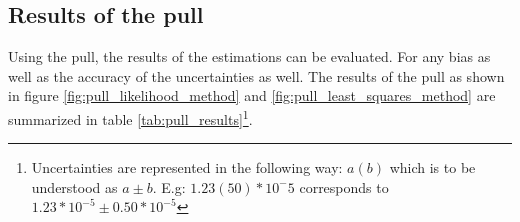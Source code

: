 \documentclass[11pt, a4paper, oneside]{book}
\newcommand{\pion}{$\pi^{-}$}
\begin{document}



\subsection{Results of the pull} 

Using the pull, the results of the estimations can be evaluated. For any bias as well as the accuracy of the uncertainties as well. The results of the pull as shown in figure \ref{fig:pull_likelihood_method} and \ref{fig:pull_least_squares_method} are summarized in table \ref{tab:pull_results}\footnote{Uncertainties are represented in the following way: $a(b)$ which is to be understood as $a \pm b$. E.g: $1.23(50)*10^-5$ corresponds to $1.23*10^{-5} \pm 0.50 * 10^{-5}$}.
\end{document}
